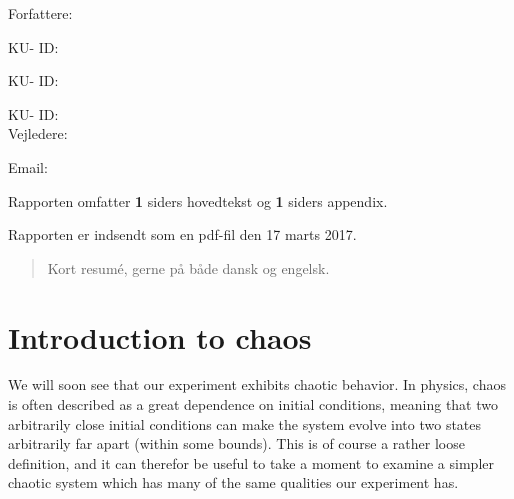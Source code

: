 \documentclass[12pt,oneside,a4paper]{article}
\numberwithin{equation}{section}
\begin{document}
\vfill
{\large Forfattere:}\\
{\large \hspace*{1cm}   \hspace{1cm} KU- ID:  \\
{\large \hspace*{1cm}    \hspace{1cm} KU- ID:  \\
{\large \hspace*{1cm}    \hspace{1cm} KU- ID:  \\

{\large Vejledere:}\\
{\large \hspace*{1cm}   \hspace{1cm} Email:  \\

\vfill

{\large Rapporten omfatter {\bf 1} siders hovedtekst og {\bf 1} siders appendix.}

{\large Rapporten er indsendt som en pdf-fil den 17 marts 2017. }

\normalsize


\newpage
\begin{abstract}
Kort resumé, gerne på både dansk og engelsk.
\end{abstract}

\newpage

\tableofcontents


\newpage
{}
\section{Introduction to chaos}
\label{chaos}
We will soon see that our experiment exhibits chaotic behavior. In physics, chaos is often described as a great dependence on initial conditions, meaning that two arbitrarily close initial conditions can make the system evolve into two states arbitrarily far apart (within some bounds). This is of course a rather loose definition, and it can therefor be useful to take a moment to examine a simpler chaotic system which has many of the same qualities our experiment has.

}}}}
\end{document}
